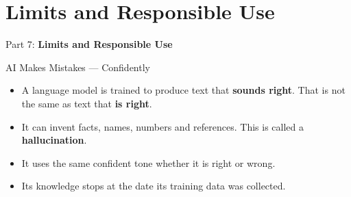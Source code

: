 \section{Limits and Responsible Use}
\begin{frame}{}
    \LARGE Part 7: \textbf{Limits and Responsible Use}
\end{frame}

\begin{frame}{AI Makes Mistakes --- Confidently}
    \begin{itemize}
        \setlength\itemsep{0.8em}
        \item A language model is trained to produce text that \textbf{sounds right}. That is not the same as text that \textbf{is right}.
        \item It can invent facts, names, numbers and references. This is called a \textbf{hallucination}.
        \item It uses the same confident tone whether it is right or wrong.
        \item Its knowledge stops at the date its training data was collected.
    \end{itemize}

    \vspace{1em}
\end{frame}

